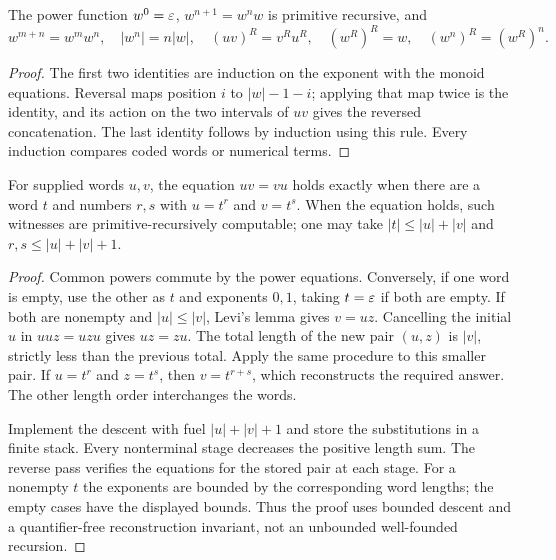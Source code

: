 \begin{lemma}\label{word:powers}
The power function $w^0=\varepsilon$, $w^{n+1}=w^nw$ is primitive recursive,
and
\[
 w^{m+n}=w^mw^n,\quad |w^n|=n|w|,\quad
 (uv)^R=v^Ru^R,\quad (w^R)^R=w,\quad (w^n)^R=(w^R)^n.
\]
\end{lemma}
\begin{proof}
The first two identities are induction on the exponent with the monoid
equations. Reversal maps position $i$ to $|w|-1-i$; applying that map
twice is the identity, and its action on the two intervals of $uv$
gives the reversed concatenation. The last identity follows by induction
using this rule. Every induction compares coded words or numerical terms.
\end{proof}

\begin{theorem}
\label{word:commute}
For supplied words $u,v$, the equation $uv=vu$ holds exactly when there
are a word $t$ and numbers $r,s$ with $u=t^r$ and $v=t^s$.
When the equation holds, such witnesses are primitive-recursively
computable; one may take $|t|\le |u|+|v|$ and $r,s\le |u|+|v|+1$.
\end{theorem}
\begin{proof}
Common powers commute by the power equations. Conversely, if one word is
empty, use the other as $t$ and exponents $0,1$, taking $t=\varepsilon$ if both
are empty. If both are nonempty and $|u|\le|v|$, Levi's lemma gives
$v=uz$. Cancelling the initial $u$ in $uuz=uzu$ gives $uz=zu$.
The total length of the new pair $(u,z)$ is $|v|$, strictly less than
the previous total. Apply the same procedure to this smaller pair. If
$u=t^r$ and $z=t^s$, then $v=t^{r+s}$, which reconstructs the required
answer. The other length order interchanges the words.

Implement the descent with fuel $|u|+|v|+1$ and store the substitutions
in a finite stack. Every nonterminal stage decreases the positive length
sum. The reverse pass verifies the equations for the stored pair at each
stage. For a nonempty $t$ the exponents are bounded by the corresponding
word lengths; the empty cases have the displayed bounds. Thus the proof
uses bounded descent and a quantifier-free reconstruction invariant, not
an unbounded well-founded recursion.
\end{proof}

